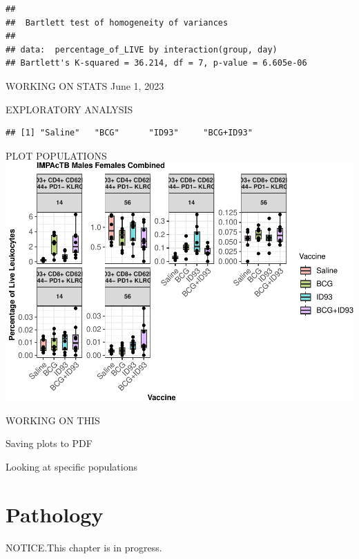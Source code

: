 \documentclass[
]{book}
\begin{document}
\begin{verbatim}
## 
##  Bartlett test of homogeneity of variances
## 
## data:  percentage_of_LIVE by interaction(group, day)
## Bartlett's K-squared = 36.214, df = 7, p-value = 6.605e-06
\end{verbatim}

WORKING ON STATS June 1, 2023

EXPLORATORY ANALYSIS

\begin{verbatim}
## [1] "Saline"   "BCG"      "ID93"     "BCG+ID93"
\end{verbatim}

PLOT POPULATIONS
\includegraphics{csu-impactb_files/figure-latex/unnamed-chunk-75-1.pdf}

WORKING ON THIS

Saving plots to PDF

Looking at specific populations

\chapter{Pathology}\label{pathology}

NOTICE.This chapter is
in progress.

  
\end{document}
